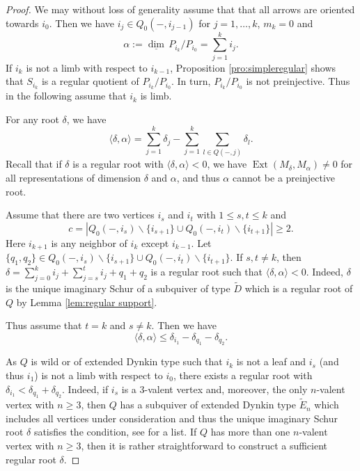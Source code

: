\documentclass{amsart}
\newcommand{\sayT}[1]{\say[T]{#1}}
\numberwithin{equation}{section}
\newcommand\udim{{\underline{\dim}\, }}
\newcommand{\Ext}{\operatorname{Ext}}
\newcommand{\Sc}[2]{\langle #1,#2\rangle}
\begin{document}
\begin{proof}
  We may without loss of generality assume that that all arrows are oriented towards $i_0$. Then we have $i_j\in Q_0(-,i_{j-1})$ for $j=1,\ldots,k$, $m_k=0$ and
  $$\alpha:=\udim P_{i_k}/P_{i_0}=\sum_{j=1}^{k}i_j.$$
	  If $i_k$ is not a limb with respect to $i_{k-1}$,  Proposition \ref{pro:simpleregular} shows that $S_{i_k}$ is a regular quotient of $P_{i_k}/P_{i_0}$. In turn, $P_{i_k}/P_{i_0}$ is not preinjective. Thus in the following assume that $i_k$ is limb.


	For any root $\delta$, we have 
$$\Sc{\delta}{\alpha}=\sum_{j=1}^k\delta_j-\sum_{j=1}^k\sum_{l\in Q(-,j)}\delta_l.$$
Recall that if $\delta$ is a regular root with $\Sc{\delta}{\alpha}<0$, we have $\Ext(M_\delta,M_\alpha)\neq 0$ for all representations of dimension $\delta$ and $\alpha$, and thus $\alpha$ cannot be a preinjective root.

	Assume that there are two vertices $i_s$ and $i_t$ with $1\leq s,t\leq k$ and
  $$c=|Q_0(-,i_s)\backslash\{i_{s+1}\}\cup Q_0(-,i_t)\backslash\{i_{t+1}\}|\geq 2.$$
	Here $i_{k+1}$ is any neighbor of $i_k$ except $i_{k-1}$. Let $\{q_1,q_2\}\in Q_0(-,i_s)\backslash\{i_{s+1}\}\cup Q_0(-,i_t)\backslash\{i_{t+1}\}$.
  If $s,t\neq k$, then  $\delta=\sum_{j=0}^ki_j+\sum_{j=s}^ti_j+q_1+q_2$ is a regular root such that $\Sc{\delta}{\alpha}<0$. Indeed, $\delta$ is the unique imaginary Schur of a subquiver of type $\tilde D$ which is a regular root of $Q$ by Lemma \ref{lem:regular support}.	
	
Thus assume that $t=k$ and $s\neq k$. 
Then we have
$$\Sc{\delta}{\alpha}\leq \delta_{i_1}-\delta_{q_1}-\delta_{q_2}.$$


As $Q$ is wild or of extended Dynkin type such that $i_k$ is not a leaf and $i_s$ (and thus $i_1$) is not a limb with respect to $i_0$, there exists a regular root with $\delta_{i_1}<\delta_{q_1}+\delta_{q_2}$. Indeed, if $i_s$ is a $3$-valent vertex and, moreover, the only $n$-valent vertex with $n\geq 3$, then $Q$ has a subquiver of extended Dynkin type $\tilde E_n$ which includes all vertices under consideration and thus the unique imaginary Schur root $\delta$ satisfies the condition, see \cite[Section 4]{CB} for a list. If $Q$ has more than one $n$-valent vertex with $n\geq 3$, then it is rather straightforward to construct a sufficient regular root $\delta$.\sayT{details here or below?}
\begin{comment}
The unique exceptional representation of dimension 
$\alpha:=\sum_{j=s}^ki_j$ is a factor of $P_{i_k}/P_{i_0}$. Consider the full subquiver $Q'$ with vertices $Q_0\backslash\{i_{k+1},\ldots,i_n\}$. When reflecting successively at the sources $i_k,\ldots,i_{s-1}$ the representation $P_{i_k}/P_{i_0}$ transforms into the simple representation $S_s$ of the corresponding transformation of $Q'$. By Proposition \ref{pro:simpleregular}, the representation $S_s$ is a preinjective representation of $Q'$ if and only if $q_1$ is a limb with respect to $s$. By Lemma \ref{lem:regular support} and the argument from above, this shows that $P_{i_k}/P_{i_0}$ is regular if $q_1$ is not limb.
\end{comment}


\end{proof}
\end{document}

